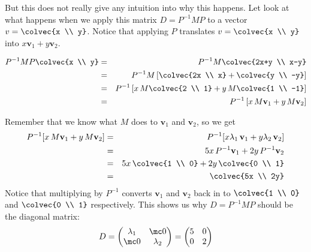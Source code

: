 {But this does not really give any intuition into why this happens. Let look at what happens when we apply this matrix $D = P^{-1}MP$ to a vector $v = \colvec{x \\ y}$. Notice that applying $P$ translates $v = \colvec{x \\ y}$ into $x\mathbf{v}_1+ y\mathbf{v}_2$.

\begin{eqnarray*}
P^{-1}MP
\colvec{x \\ y} &=& P^{-1}M \colvec{2x+y \\ x-y} \\
&=& P^{-1}M \left[\colvec{2x \\ x} + \colvec{y \\ -y}\right] \\
&=& P^{-1}\left[ x\, M \colvec{2 \\ 1} + y\,  M\colvec{1 \\ -1}\right]\\
&=& P^{-1}\left[ x\, M\mathbf{v}_1 + y\,   M\mathbf{v}_2\right]\\
\end{eqnarray*}

Remember that we know what $M$ does to $\mathbf{v}_1$ and $\mathbf{v}_2$, so we get
\begin{eqnarray*}
P^{-1}[ x\, M\mathbf{v}_1 + y\, M\mathbf{v}_2] &=& P^{-1}[ x \lambda_1\,  \mathbf{v}_1 + y \lambda_2 \,  \mathbf{v}_2] \\
&=& 5x\,   P^{-1}\mathbf{v}_1 + 2y \,   P^{-1} \mathbf{v}_2 \\
&=& 5x\,   \colvec{1 \\ 0} + 2y \,  \colvec{0 \\ 1} \\
&=& \colvec{5x \\ 2y}
\end{eqnarray*}
Notice that multiplying by $P^{-1}$ converts $\mathbf{v}_1$ and $\mathbf{v}_2$ back in to $ \colvec{1 \\ 0}$ and $ \colvec{0 \\ 1}$ respectively. This shows us why $D = P^{-1}MP$ should be the diagonal matrix:
\[ D = \begin{pmatrix}
\lambda_1 &\mc0\\
\mc0 & \lambda_2
\end{pmatrix}
=\begin{pmatrix}
5 &0\\
0 & 2
\end{pmatrix}
\]
} %

